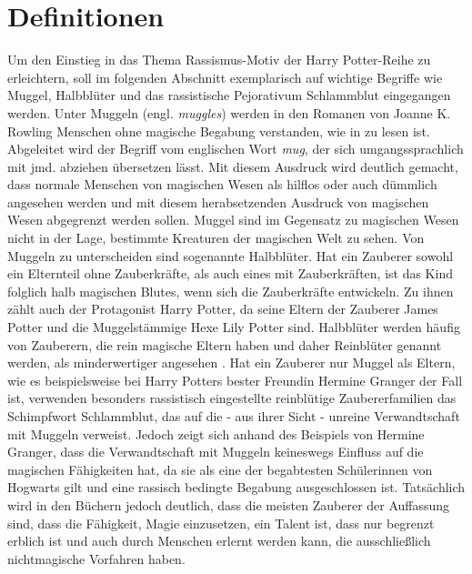 \section{Definitionen}
Um den Einstieg in das Thema \glqq Rassismus-Motiv der  \glq Harry Potter\grq-Reihe\grqq{} zu erleichtern, soll im folgenden Abschnitt exemplarisch auf wichtige Begriffe wie \glqq Muggel\grqq, \glqq Halbblüter\grqq{} und das rassistische Pejorativum \glqq Schlammblut\grqq{} eingegangen werden.
Unter \glqq Muggeln\grqq{} (engl. \emph{muggles}) werden in den Romanen von Joanne K. Rowling Menschen ohne magische Begabung verstanden, wie in \cite[S. \,61]{JKR97} zu lesen ist. 
Abgeleitet wird der Begriff vom englischen Wort \emph{mug}, der sich umgangssprachlich mit \glqq jmd. abziehen\grqq{} übersetzen lässt. 
Mit diesem Ausdruck wird deutlich gemacht, dass \glqq normale\grqq{} Menschen von magischen Wesen als hilflos oder auch dümmlich angesehen werden und mit diesem herabsetzenden Ausdruck von magischen Wesen abgegrenzt werden sollen.
Muggel sind im Gegensatz zu magischen Wesen nicht in der Lage, bestimmte Kreaturen der magischen Welt zu sehen.
Von Muggeln zu unterscheiden sind sogenannte \glqq Halbblüter\grqq. 
Hat ein Zauberer sowohl ein Elternteil ohne Zauberkräfte, als auch eines mit Zauberkräften, ist das Kind folglich halb magischen \glqq Blutes\grqq, wenn sich die Zauberkräfte entwickeln. 
Zu ihnen zählt auch der Protagonist Harry Potter, da seine Eltern der Zauberer James Potter und die Muggelstämmige Hexe Lily Potter sind.
Halbblüter werden häufig von Zauberern, die rein magische Eltern haben und daher \glqq Reinblüter\grqq{} genannt werden, als minderwertiger angesehen \cite[S.\,220]{JKR03}. 
Hat ein Zauberer nur Muggel als Eltern, wie es beispielsweise bei Harry Potters bester Freundin Hermine Granger der Fall ist, verwenden besonders rassistisch eingestellte reinblütige Zaubererfamilien das Schimpfwort \glqq Schlammblut\grqq, das auf die - aus ihrer Sicht -  \glqq unreine\grqq{} Verwandtschaft mit Muggeln verweist.
Jedoch zeigt sich anhand des Beispiels von Hermine Granger, dass die Verwandtschaft mit Muggeln keineswegs Einfluss auf die magischen Fähigkeiten hat, da sie als eine der begabtesten Schülerinnen von Hogwarts gilt und eine rassisch bedingte Begabung ausgeschlossen ist.
Tatsächlich wird in den Büchern jedoch deutlich, dass die meisten Zauberer der Auffassung sind, dass die Fähigkeit, Magie einzusetzen, ein Talent ist, dass nur begrenzt erblich ist und auch durch Menschen erlernt werden kann, die ausschließlich nichtmagische Vorfahren haben. 

